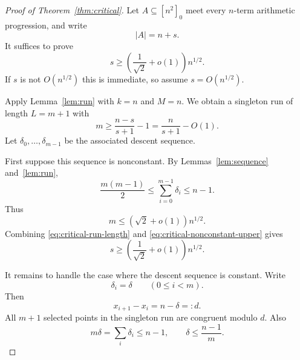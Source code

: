 \documentclass[10pt,a4paper]{amsart}
\numberwithin{equation}{section}
\begin{document}
\begin{proof}[Proof of Theorem~\ref{thm:critical}]
Let $A\subseteq[n^2]_0$ meet every $n$-term arithmetic progression, and write
\[
        |A|=n+s.
\]
It suffices to prove
\[
        s\ge \left(\frac1{\sqrt2}+o(1)\right)n^{1/2}.
\]
If $s$ is not $O(n^{1/2})$ this is immediate, so assume $s=O(n^{1/2})$.

Apply Lemma~\ref{lem:run} with $k=n$ and $M=n$.
We obtain a singleton run of length $L=m+1$ with
\begin{equation}\label{eq:critical-run-length}
        m\ge \frac{n-s}{s+1}-1
        =
        \frac{n}{s+1}-O(1).
\end{equation}
Let $\delta_0,\ldots,\delta_{m-1}$ be the associated descent sequence.

First suppose this sequence is nonconstant.
By Lemmas~\ref{lem:sequence} and~\ref{lem:run},
\begin{equation}\label{eq:critical-nonconstant-descent}
        \frac{m(m-1)}2
        \le
        \sum_{i=0}^{m-1}\delta_i
        \le n-1.
\end{equation}
Thus
\begin{equation}\label{eq:critical-nonconstant-upper}
        m\le (\sqrt2+o(1))n^{1/2}.
\end{equation}
Combining \eqref{eq:critical-run-length} and \eqref{eq:critical-nonconstant-upper} gives
\[
        s\ge \left(\frac1{\sqrt2}+o(1)\right)n^{1/2}.
\]

It remains to handle the case where the descent sequence is constant.
Write
\[
        \delta_i=\delta
        \qquad
        (0\le i<m).
\]
Then
\[
        x_{i+1}-x_i=n-\delta=:d.
\]
All $m+1$ selected points in the singleton run are congruent modulo $d$.
Also
\begin{equation}\label{eq:critical-delta-bound}
        m\delta=\sum_i\delta_i\le n-1,
        \qquad
        \delta\le \frac{n-1}{m}.
\end{equation}


\end{proof}
\end{document}
